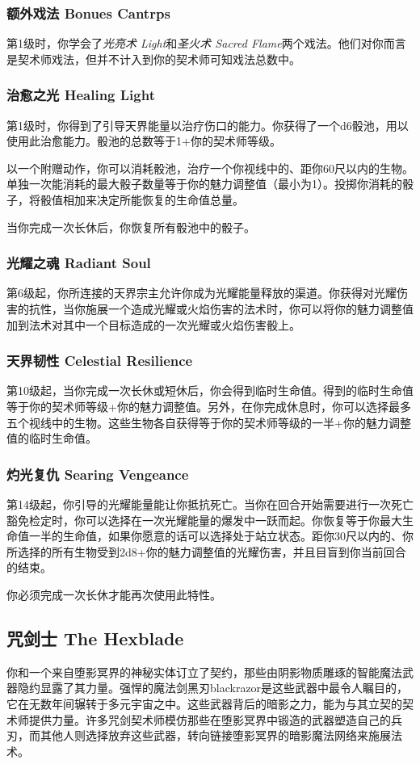\subsubsection{额外戏法 Bonues Cantrps}第1级时，你学会了\emph{光亮术 Light}和\emph{圣火术 Sacred Flame}两个戏法。他们对你而言是契术师戏法，但并不计入到你的契术师可知戏法总数中。

\subsubsection{治愈之光 Healing Light}第1级时，你得到了引导天界能量以治疗伤口的能力。你获得了一个d6骰池，用以使用此治愈能力。骰池的总数等于1+你的契术师等级。

以一个附赠动作，你可以消耗骰池，治疗一个你视线中的、距你60尺以内的生物。单独一次能消耗的最大骰子数量等于你的魅力调整值（最小为1）。投掷你消耗的骰子，将骰值相加来决定所能恢复的生命值总量。

当你完成一次长休后，你恢复所有骰池中的骰子。

\subsubsection{光耀之魂 Radiant Soul}第6级起，你所连接的天界宗主允许你成为光耀能量释放的渠道。你获得对光耀伤害的抗性，当你施展一个造成光耀或火焰伤害的法术时，你可以将你的魅力调整值加到法术对其中一个目标造成的一次光耀或火焰伤害骰上。

\subsubsection{天界韧性 Celestial Resilience}第10级起，当你完成一次长休或短休后，你会得到临时生命值。得到的临时生命值等于你的契术师等级+你的魅力调整值。另外，在你完成休息时，你可以选择最多五个视线中的生物。这些生物各自获得等于你的契术师等级的一半+你的魅力调整值的临时生命值。

\subsubsection{灼光复仇 Searing Vengeance}第14级起，你引导的光耀能量能让你抵抗死亡。当你在回合开始需要进行一次死亡豁免检定时，你可以选择在一次光耀能量的爆发中一跃而起。你恢复等于你最大生命值一半的生命值，如果你愿意的话可以选择处于站立状态。距你30尺以内的、你所选择的所有生物受到2d8+你的魅力调整值的光耀伤害，并且目盲到你当前回合的结束。

你必须完成一次长休才能再次使用此特性。


\subsection{咒剑士 The Hexblade}你和一个来自堕影冥界的神秘实体订立了契约，那些由阴影物质雕琢的智能魔法武器隐约显露了其力量。强悍的魔法剑黑刃blackrazor是这些武器中最令人瞩目的，它在无数年间辗转于多元宇宙之中。这些武器背后的暗影之力，能为与其立契的契术师提供力量。许多咒剑契术师模仿那些在堕影冥界中锻造的武器塑造自己的兵刃，而其他人则选择放弃这些武器，转向链接堕影冥界的暗影魔法网络来施展法术。

